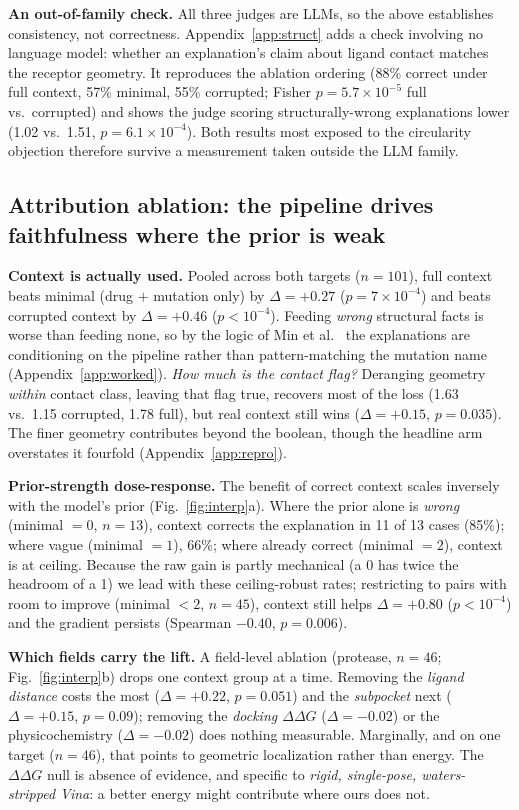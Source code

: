 \documentclass{article}
\newcommand{\ddg}{\ensuremath{\Delta\Delta G}}
\begin{document}
\textbf{An out-of-family check.} All three judges are LLMs, so the above establishes consistency, not correctness. Appendix~\ref{app:struct} adds a check involving no language model: whether an explanation's claim about ligand contact matches the receptor geometry. It reproduces the ablation ordering (88\% correct under full context, 57\% minimal, 55\% corrupted; Fisher $p=5.7\times10^{-5}$ full vs.\ corrupted) and shows the judge scoring structurally-wrong explanations lower (1.02 vs.\ 1.51, $p=6.1\times10^{-4}$). Both results most exposed to the circularity objection therefore survive a measurement taken outside the LLM family.

\subsection{Attribution ablation: the pipeline drives faithfulness where the prior is weak}
\label{sec:abl}

\textbf{Context is actually used.} Pooled across both targets ($n=101$), full context beats minimal (drug $+$ mutation only) by $\Delta=+0.27$ ($p=7\times10^{-4}$) and beats corrupted context by $\Delta=+0.46$ ($p<10^{-4}$). Feeding \emph{wrong} structural facts is worse than feeding none, so by the logic of Min et al.~\citep{min2022} the explanations are conditioning on the pipeline rather than pattern-matching the mutation name (Appendix~\ref{app:worked}). \emph{How much is the contact flag?} Deranging geometry \emph{within} contact class, leaving that flag true, recovers most of the loss (1.63 vs.\ 1.15 corrupted, 1.78 full), but real context still wins ($\Delta=+0.15$, $p=0.035$). The finer geometry contributes beyond the boolean, though the headline arm overstates it fourfold (Appendix~\ref{app:repro}).

\textbf{Prior-strength dose-response.} The benefit of correct context scales inversely with the model's prior (Fig.~\ref{fig:interp}a). Where the prior alone is \emph{wrong} (minimal $=0$, $n=13$), context corrects the explanation in 11 of 13 cases (85\%); where vague (minimal $=1$), 66\%; where already correct (minimal $=2$), context is at ceiling. Because the raw gain is partly mechanical (a 0 has twice the headroom of a 1) we lead with these ceiling-robust rates; restricting to pairs with room to improve (minimal $<2$, $n=45$), context still helps $\Delta=+0.80$ ($p<10^{-4}$) and the gradient persists (Spearman $-0.40$, $p=0.006$).

\textbf{Which fields carry the lift.} A field-level ablation (protease, $n=46$; Fig.~\ref{fig:interp}b) drops one context group at a time. Removing the \emph{ligand distance} costs the most ($\Delta=+0.22$, $p=0.051$) and the \emph{subpocket} next ($\Delta=+0.15$, $p=0.09$); removing the \emph{docking \ddg} ($\Delta=-0.02$) or the physicochemistry ($\Delta=-0.02$) does nothing measurable. Marginally, and on one target ($n=46$), that points to geometric localization rather than energy. The \ddg{} null is absence of evidence, and specific to \emph{rigid, single-pose, waters-stripped Vina}: a better energy \citep{amaro2008,hauser2018} might contribute where ours does not.
\end{document}

